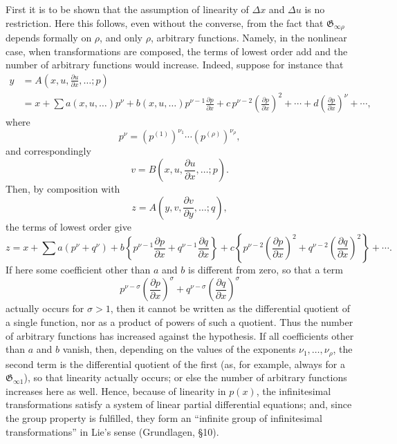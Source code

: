 \documentclass[11pt]{article}
\newcommand{\D}{\Delta}
\providecommand{\G}{\mathfrak G}
\providecommand{\p}{\partial}
\providecommand{\p}{\partial}
\begin{document}
First it is to be shown that the assumption of linearity of \(\D x\) and \(\D u\) is no restriction. Here this follows, even without the converse, from the fact that \(\G_{\infty\rho}\) depends formally on \(\rho\), and only \(\rho\), arbitrary functions. Namely, in the nonlinear case, when transformations are composed, the terms of lowest order add and the number of arbitrary functions would increase. Indeed, suppose for instance that
\[
\begin{aligned}
y&=A\!\left(x,u,\frac{\p u}{\p x},\ldots;p\right)\\
&=x+\sum a(x,u,\ldots)p^\nu
+b(x,u,\ldots)p^{\nu-1}\frac{\p p}{\p x}
+c\,p^{\nu-2}\left(\frac{\p p}{\p x}\right)^2+\cdots
+d\left(\frac{\p p}{\p x}\right)^\nu+\cdots,
\end{aligned}
\]
where
\[
p^\nu=(p^{(1)})^{\nu_1}\cdots(p^{(\rho)})^{\nu_\rho},
\]
and correspondingly
\[
v=B\!\left(x,u,\frac{\p u}{\p x},\ldots;p\right).
\]
Then, by composition with
\[
z=A\!\left(y,v,\frac{\p v}{\p y},\ldots;q\right),
\]
the terms of lowest order give
\[
z=x+\sum a(p^\nu+q^\nu)+
b\left\{p^{\nu-1}\frac{\p p}{\p x}+q^{\nu-1}\frac{\p q}{\p x}\right\}
+c\left\{p^{\nu-2}\left(\frac{\p p}{\p x}\right)^2
+q^{\nu-2}\left(\frac{\p q}{\p x}\right)^2\right\}+\cdots.
\]
If here some coefficient other than \(a\) and \(b\) is different from zero, so that a term
\[
p^{\nu-\sigma}\left(\frac{\p p}{\p x}\right)^\sigma
+q^{\nu-\sigma}\left(\frac{\p q}{\p x}\right)^\sigma
\]
actually occurs for \(\sigma>1\), then it cannot be written as the differential quotient of a single function, nor as a product of powers of such a quotient. Thus the number of arbitrary functions has increased against the hypothesis. If all coefficients other than \(a\) and \(b\) vanish, then, depending on the values of the exponents \(\nu_1,\ldots,\nu_\rho\), the second term is the differential quotient of the first (as, for example, always for a \(\G_{\infty1}\)), so that linearity actually occurs; or else the number of arbitrary functions increases here as well. Hence, because of linearity in \(p(x)\), the infinitesimal transformations satisfy a system of linear partial differential equations; and, since the group property is fulfilled, they form an ``infinite group of infinitesimal transformations'' in Lie's sense (Grundlagen, \S{}10).
\end{document}
